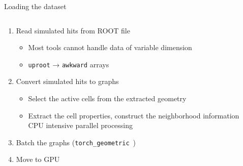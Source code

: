 \documentclass[lualatex,handout,aspectratio=1610]{beamer}
\begin{document}
\begin{frame}{Loading the dataset}
	\begin{columns}
		\begin{column}{.65\textwidth}
			\begin{enumerate}
				\item Read simulated hits from ROOT file
				      \begin{itemize}
					      \item Most tools cannot handle data of variable dimension
					      \item \texttt{uproot} → \texttt{awkward} arrays
				      \end{itemize}
				      \pause
				\item Convert simulated hits to graphs
				      \begin{itemize}
					      \item Select the active cells from the extracted geometry
					      \item Extract the cell properties, construct the neighborhood information\\
					            CPU intensive \imp parallel processing
				      \end{itemize}
				      \pause
				\item Batch the graphs (\texttt{torch\_geometric}~\cite{torch_geometric.batch})
				      \pause
				\item Move to GPU
			\end{enumerate}
		\end{column}
		\begin{column}{.33\textwidth}
		\end{column}
	\end{columns}
	\pause
\end{frame}
\end{document}

